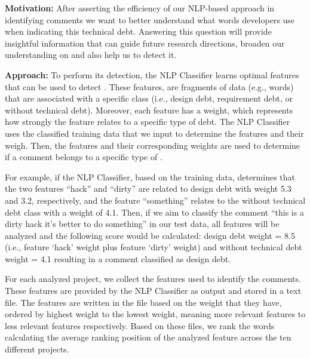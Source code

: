 \vspace{3mm}
\noindent\rqii
\vspace{3mm}

\noindent \textbf{Motivation:} After asserting the efficiency of our NLP-based approach in identifying \SATD comments we want to better understand what words developers use when indicating this technical debt. Answering this question will provide insightful information that can guide future research directions, broaden our understanding on \SATD and also help us to detect it.     

\vspace{1mm}
\noindent \textbf{Approach:} To perform its detection, the NLP Classifier learns optimal features that can be used to detect \SATD. These features, are fragments of data (e.g., words) that are associated with a specific class (i.e., design debt, requirement debt, or without technical debt). Moreover, each feature has a weight, which represents how strongly the feature relates to a specific type of debt. The NLP Classifier uses the classified training data that we input to determine the features and their weigh. Then, the features and their corresponding weights are used to determine if a comment belongs to a specific type of \SATD.

For example, if the NLP Classifier, based on the training data, determines that the two features ``hack'' and ``dirty'' are related to design debt with weight 5.3 and 3.2, respectively, and the feature ``something'' relates to the without technical debt class with a weight of 4.1. Then, if we aim to classify the comment ``this is a dirty hack it's better to do something'' in our test data, all features will be analyzed and the following score would be calculated: design debt weight = 8.5 (i.e., feature `hack' weight plus feature `dirty' weight) and without technical debt weight = 4.1 resulting in a comment classified as design debt.


For each analyzed project, we collect the features used to identify the \SATD comments. These features are provided by the NLP Classifier as output and stored in a text file. The features are written in the file based on the weight that they have, ordered by highest weight to the lowest weight, meaning more relevant features to less relevant features respectively. Based on these files, we rank the words calculating the average ranking position of the analyzed feature across the ten different projects. 

